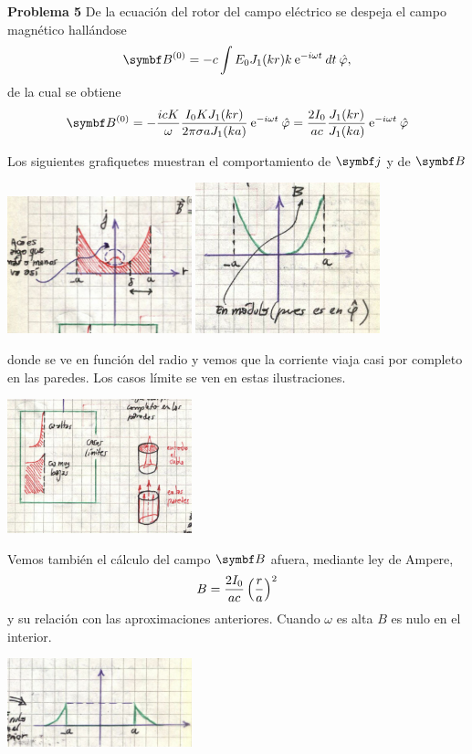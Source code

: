 \documentclass[10pt,oneside]{CBFT_book}
\begin{document}
\begin{ejemplo}{\bf Problema 5}
De la ecuación del rotor del campo eléctrico se despeja el campo magnético hallándose
\[
	\vb{B}^{(0)} = - c \int E_0 J_1(kr) k \euler^{-i \omega t} \: dt \phiver, 
\]
de la cual se obtiene
\[
	\vb{B}^{(0)} = -\frac{icK}{\omega} \frac{I_0 K J_1(kr)}{2 \pi \sigma a J_1(ka)} 
	\euler^{-i \omega t} \phiver =
	\frac{2I_0}{ac} \frac{J_1(kr)}{J_1(ka)} \euler^{-i \omega t} \phiver
\]

Los siguientes grafiquetes muestran el comportamiento de $\vb j$ y de $\vb B$

\includegraphics[width=0.4\textwidth]{images/fig_ft1_problema5_cuasiestacA.jpg}
\includegraphics[width=0.4\textwidth]{images/fig_ft1_problema5_cuasiestacB.jpg}

donde se ve en función del radio y vemos que la corriente viaja casi por completo en las
paredes. Los casos límite se ven en estas ilustraciones.

\includegraphics[width=0.4\textwidth]{images/fig_ft1_problema5_cuasiestacC.jpg}

Vemos también el cálculo del campo $\vb{B}$ afuera, mediante ley de Ampere,
\[
	B = \frac{2I_0}{ac} \left( \frac{ r }{ a } \right)^2
\]
y su relación con las aproximaciones anteriores. Cuando $\omega$ es alta $B$ es nulo en el
interior.

\includegraphics[width=0.4\textwidth]{images/fig_ft1_problema5_cuasiestacD.jpg}


\end{ejemplo}
\end{document}
